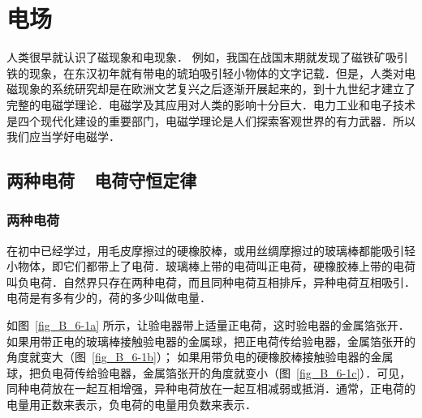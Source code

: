 \chapter{电场}\label{chapter-electric-field}

人类很早就认识了磁现象和电现象．
例如，我国在战国末期就发现了磁铁矿吸引铁的现象，在东汉初年就有带电的琥珀吸引轻小物体的文字记载．但是，人类对电磁现象的系统研究却是在欧洲文艺复兴之后逐渐开展起来的，到十九世纪才建立了完整的电磁学理论．电磁学及其应用对人类的影响十分巨大．电力工业和电子技术是四个现代化建设的重要部门，电磁学理论是人们探索客观世界的有力武器．所以我们应当学好电磁学．

\section{两种电荷~~电荷守恒定律}
\subsection{两种电荷}
在初中已经学过，用毛皮摩擦过的硬橡胶棒，或用丝绸摩擦过的玻璃棒都能吸引轻小物体，即它们都带上了电荷．玻璃棒上带的电荷叫正电荷，硬橡胶棒上带的电荷叫负电荷．自然界只存在两种电荷，而且同种电荷互相排斥，异种电荷互相吸引．电荷是有多有少的，荷的多少叫做电量．


如图~\ref{fig_B_6-1a} 所示，让验电器带上适量正电荷，这时验电器的金属箔张开．如果用带正电的玻璃棒接触验电器的金属球，把正电荷传给验电器，金属箔张开的角度就变大（图~\ref{fig_B_6-1b}）；
如果用带负电的硬橡胶棒接触验电器的金属球，把负电荷传给验电器，金属箔张开的角度就变小（图~\ref{fig_B_6-1c}）．可见，同种电荷放在一起互相增强，异种电荷放在一起互相减弱或抵消．通常，正电荷的电量用正数来表示，负电荷的电量用负数来表示．


